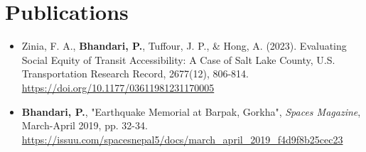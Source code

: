 \section{ \textbf{ Publications}}
    \begin{itemize}[leftmargin=0.15in, label={}]
    	\item{Zinia, F. A., \textbf{Bhandari, P.}, Tuffour, J. P., \& Hong, A. (2023). Evaluating Social Equity of Transit Accessibility: A Case of Salt Lake County, U.S. Transportation Research Record, 2677(12), 806-814. \url{https://doi.org/10.1177/03611981231170005}} \\
         \item{\textbf{Bhandari, P.}, "Earthquake Memorial at Barpak, Gorkha", \textit{Spaces Magazine}, March-April 2019, pp. 32-34. \url{https://issuu.com/spacesnepal5/docs/march_april_2019_f4d9f8b25cec23}} \\
    \end{itemize}
